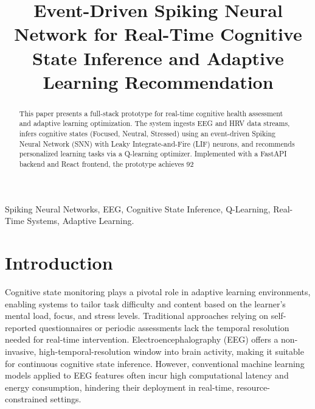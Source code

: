 \documentclass[conference]{IEEEtran}
\begin{document}
\title{Event-Driven Spiking Neural Network for Real-Time Cognitive State Inference and Adaptive Learning Recommendation}
\author{
}
\maketitle

\begin{abstract}
This paper presents a full-stack prototype for real-time cognitive health assessment and adaptive learning optimization. The system ingests EEG and HRV data streams, infers cognitive states (Focused, Neutral, Stressed) using an event-driven Spiking Neural Network (SNN) with Leaky Integrate-and-Fire (LIF) neurons, and recommends personalized learning tasks via a Q-learning optimizer. Implemented with a FastAPI backend and React frontend, the prototype achieves 92%
\end{abstract}

\begin{IEEEkeywords}
Spiking Neural Networks, EEG, Cognitive State Inference, Q-Learning, Real-Time Systems, Adaptive Learning.
\end{IEEEkeywords}

\section{Introduction}
\label{introduction}
Cognitive state monitoring plays a pivotal role in adaptive learning environments, enabling systems to tailor task difficulty and content based on the learner's mental load, focus, and stress levels. Traditional approaches relying on self-reported questionnaires or periodic assessments lack the temporal resolution needed for real-time intervention. Electroencephalography (EEG) offers a non-invasive, high-temporal-resolution window into brain activity, making it suitable for continuous cognitive state inference. However, conventional machine learning models applied to EEG features often incur high computational latency and energy consumption, hindering their deployment in real-time, resource-constrained settings.
\end{document}
